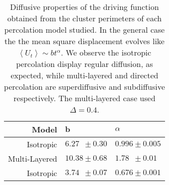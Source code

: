 \begin{table}
\begin{centering}
\begin{tabular}{rll}
\bottomrule[0.1mm]
\toprule[0.1mm]
\textbf{Model}  & $\mathbf{b}$        & \boldmath$\alpha$   \\
\toprule[0.1mm]
Isotropic       & $6.27\,\,\,\pm0.30$ & $0.996\pm0.005$     \\[0.2cm]
Multi-Layered   & $10.38\pm0.68$      & $1.78\,\,\,\pm0.01$ \\[0.2cm]
Isotropic       & $3.74\,\,\,\pm0.07$ & $0.676\pm0.001$     \\[0.2cm]
\bottomrule[0.1mm]
\toprule[0.1mm]
\end{tabular}
\par\end{centering}
\caption{Diffusive properties of the driving function obtained from the cluster
    perimeters of each percolation model studied. In the general case the the
    mean square displacement evolves like $\left\langle U_t\right\rangle\sim
    bt^\alpha$. We observe the isotropic percolation display regular diffusion,
    as expected, while multi-layered and directed percolation are
    superdiffusive and subdiffusive respectively. The multi-layered case used
    $\Delta=0.4$.}
\label{tab:diff}
\end{table}
